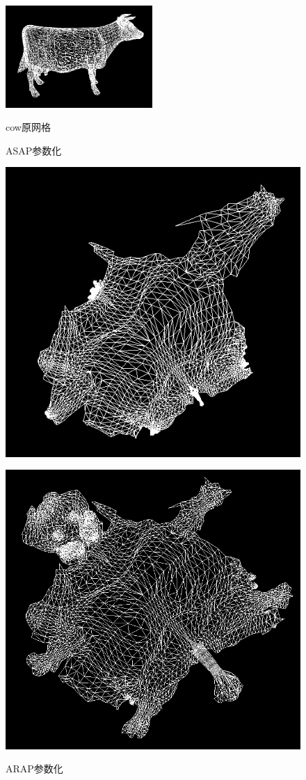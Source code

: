 \documentclass{article}
\begin{document}
	\begin{figure}[htb]
		\caption{\label{table.label} cow原网格} \centering
		\begin{center}
			\includegraphics[width=2.2in]{cow.jpg}
			\label{figure.label}
		\end{center}
	\end{figure}
	\begin{figure}[htbp]
		\centering
		\begin{minipage}{0.49\linewidth}
			\centering
			\caption{ASAP参数化}
			\includegraphics[width=0.8\linewidth]{cow_asap.JPG}
			\label{chutian2}%
		\end{minipage}
		\begin{minipage}{0.49\linewidth}
			\centering
			\caption{ARAP参数化}
			\includegraphics[width=0.8\linewidth]{cow_arap.JPG}
			\label{chutian2}%
		\end{minipage}
	\end{figure}
\end{document}
